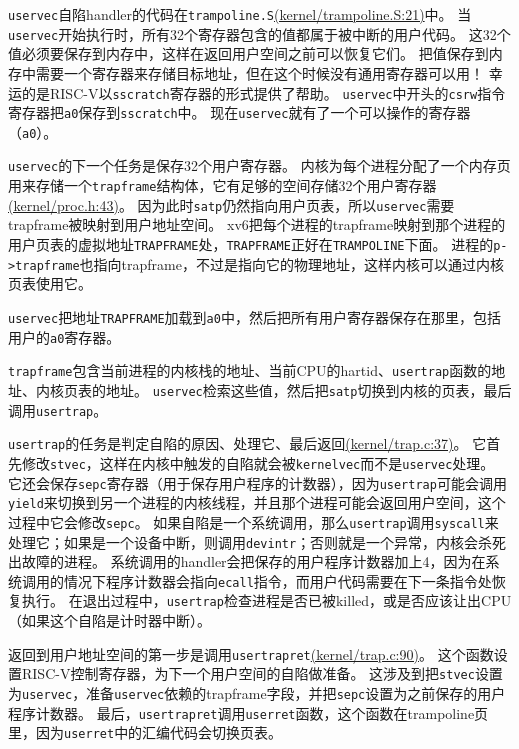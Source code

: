 \texttt{uservec}自陷handler的代码在\texttt{trampoline.S}\href{https://github.com/mit-pdos/xv6-riscv/blob/risc/kernel/trampoline.S#L21}{(kernel/trampoline.S:21)}中。
当\texttt{uservec}开始执行时，所有32个寄存器包含的值都属于被中断的用户代码。
这32个值必须要保存到内存中，这样在返回用户空间之前可以恢复它们。
把值保存到内存中需要一个寄存器来存储目标地址，但在这个时候没有通用寄存器可以用！
幸运的是RISC-V以\texttt{sscratch}寄存器的形式提供了帮助。
\texttt{uservec}中开头的\texttt{csrw}指令寄存器把\texttt{a0}保存到\texttt{sscratch}中。
现在\texttt{uservec}就有了一个可以操作的寄存器（\texttt{a0}）。

\texttt{uservec}的下一个任务是保存32个用户寄存器。
内核为每个进程分配了一个内存页用来存储一个\texttt{trapframe}结构体，它有足够的空间存储32个用户寄存器\href{https://github.com/mit-pdos/xv6-riscv/blob/risc/kernel/proc.h#L43}{(kernel/proc.h:43)}。
因为此时\texttt{satp}仍然指向用户页表，所以\texttt{uservec}需要trapframe被映射到用户地址空间。
xv6把每个进程的trapframe映射到那个进程的用户页表的虚拟地址\texttt{TRAPFRAME}处，\texttt{TRAPFRAME}正好在\texttt{TRAMPOLINE}下面。
进程的\texttt{p->trapframe}也指向trapframe，不过是指向它的物理地址，这样内核可以通过内核页表使用它。

\texttt{uservec}把地址\texttt{TRAPFRAME}加载到\texttt{a0}中，然后把所有用户寄存器保存在那里，包括用户的\texttt{a0}寄存器。

\texttt{trapframe}包含当前进程的内核栈的地址、当前CPU的hartid、\texttt{usertrap}函数的地址、内核页表的地址。
\texttt{uservec}检索这些值，然后把\texttt{satp}切换到内核的页表，最后调用\texttt{usertrap}。

\texttt{usertrap}的任务是判定自陷的原因、处理它、最后返回\href{https://github.com/mit-pdos/xv6-riscv/blob/risc/kernel/trap.c#L37}{(kernel/trap.c:37)}。
它首先修改\texttt{stvec}，这样在内核中触发的自陷就会被\texttt{kernelvec}而不是\texttt{uservec}处理。
它还会保存\texttt{sepc}寄存器（用于保存用户程序的计数器），因为\texttt{usertrap}可能会调用\texttt{yield}来切换到另一个进程的内核线程，并且那个进程可能会返回用户空间，这个过程中它会修改\texttt{sepc}。
如果自陷是一个系统调用，那么\texttt{usertrap}调用\texttt{syscall}来处理它；如果是一个设备中断，则调用\texttt{devintr}；否则就是一个异常，内核会杀死出故障的进程。
系统调用的handler会把保存的用户程序计数器加上4，因为在系统调用的情况下程序计数器会指向\texttt{ecall}指令，而用户代码需要在下一条指令处恢复执行。
在退出过程中，\texttt{usertrap}检查进程是否已被killed，或是否应该让出CPU（如果这个自陷是计时器中断）。

返回到用户地址空间的第一步是调用\texttt{usertrapret}\href{https://github.com/mit-pdos/xv6-riscv/blob/risc/kernel/trap.c#L90}{(kernel/trap.c:90)}。
这个函数设置RISC-V控制寄存器，为下一个用户空间的自陷做准备。
这涉及到把\texttt{stvec}设置为\texttt{uservec}，准备\texttt{uservec}依赖的trapframe字段，并把\texttt{sepc}设置为之前保存的用户程序计数器。
最后，\texttt{usertrapret}调用\texttt{userret}函数，这个函数在trampoline页里，因为\texttt{userret}中的汇编代码会切换页表。

